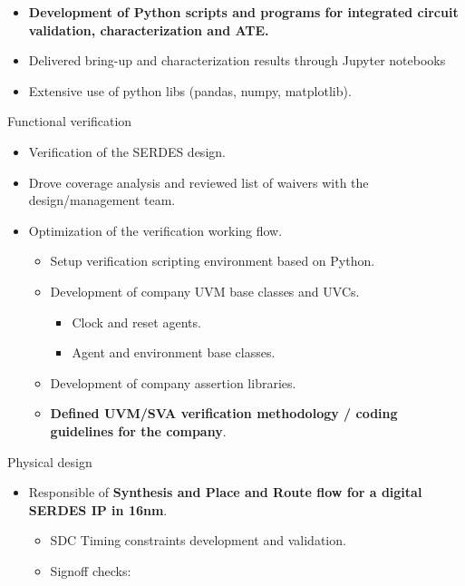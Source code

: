 \begin{cventries}
{\begin{cvitems}
          \begin{itemize}
            \item {\textbf{Development of Python scripts and programs for integrated circuit validation, characterization and ATE.}}
            \item {Delivered bring-up and characterization results through Jupyter notebooks}
            \item {Extensive use of python libs (pandas, numpy, matplotlib).}
          \end{itemize}
        \item {Functional verification}
        \begin{itemize}
          \item {Verification of the SERDES design.}
          \item {Drove coverage analysis and reviewed list of waivers with the design/management team.}
          \item {Optimization of the verification working flow.}
          \begin{itemize}
            \item {Setup verification scripting environment based on Python.}
            \item {Development of company UVM base classes and UVCs.}
              \begin{itemize}
                \item {Clock and reset agents.}
                \item {Agent and environment base classes.}
              \end{itemize}
            \item {Development of company assertion libraries.}
            \item {\textbf{Defined UVM/SVA verification methodology / coding guidelines for the company}.}
          \end{itemize}
        \end{itemize}
        \item {Physical design}
        \begin{itemize}
          \item {Responsible of \textbf{Synthesis and Place and Route flow for a digital SERDES IP in 16nm}.}
          \begin{itemize}
            \item {SDC Timing constraints development and validation.}
            \item {Signoff checks:}
            \begin{itemize}

\end{itemize}
\end{itemize}
\end{itemize}
\end{cvitems}}
\end{cventries}
